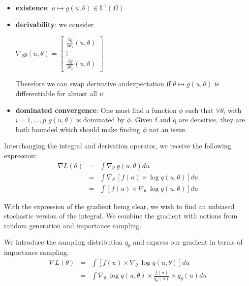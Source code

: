 \begin{itemize}
    \item \textbf{existence}: $u \mapsto g(u, \theta) \in \mathds L^1(\Omega)$  

    \item \textbf{derivability}: we consider 
    
    $\nabla_\theta g(u, \theta) = \begin{bmatrix} \frac{\partial g}{\partial \theta_1}(u, \theta) \\ \vdots \\ \frac{\partial g}{\partial \theta_p}(u, \theta) \end{bmatrix}$

    \bigskip
    
    Therefore we can swap derivative andexpectation if $\theta \mapsto g(u,\theta)$ is differentiable for almost all $u$

    \item \textbf{dominated convergence}: One must find a function $\phi$ such that $\forall \theta_i$ with $i = 1, ..., p$ $g(u,\theta)$ is dominated by $\phi$. Given f and q are densities, they are both bounded which should make finding $\phi$ not an issue.
    
\end{itemize}

\bigskip

Interchanging the integral and derivation operator, we receive the following expression: 
$$
\begin{array}{rcl}
\nabla L(\theta) &=& \displaystyle\int \nabla_\theta \ g(u, \theta) du
\\
&=& \displaystyle\int \nabla_\theta \ \left[ f(u) \times \log q(u, \theta) \right] du
\\
&=& \displaystyle\int \left[f(u) \times \nabla_\theta \ \log q(u, \theta) \right] du
\end{array}
$$



With the expression of the gradient being clear, we wish to find an unbiased stochastic version of the integral. We combine the gradient with notions from random generation and importance sampling. 

We introduce the sampling distribution $q_{\theta}$ and express our gradient in terms of importance sampling. 
$$
\begin{array}{rcl}
\nabla L(\theta) &=& \displaystyle\int \left[f(u) \times \nabla_\theta \ \log q(u, \theta) \right] du
\\
&=& \displaystyle\int \nabla_\theta \ \log q(u, \theta) \times \frac{f(u)}{q_\theta(u)} \times q_\theta(u)du
\end{array}
$$

